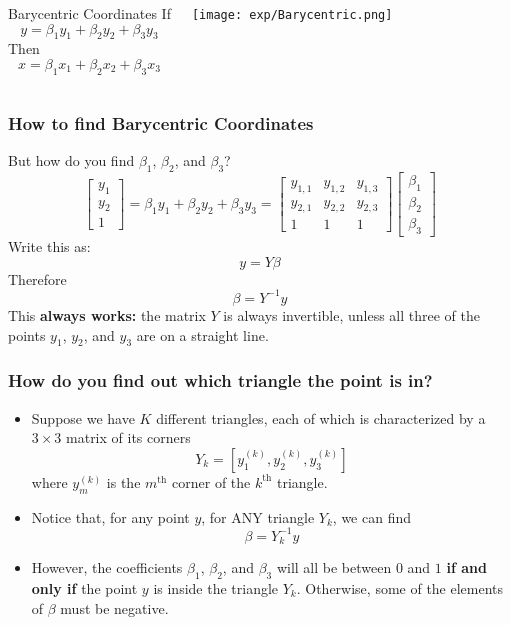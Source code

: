 \documentclass{beamer}
\begin{document}
\begin{frame}
  \begin{columns}[t]
    \column{2.5in}
    \begin{block}{Barycentric Coordinates}
      If
      \[
      y=\beta_1y_1+\beta_2y_2+\beta_3y_3
      \]
      Then
      \[
      x= \beta_1x_1+\beta_2x_2+\beta_3x_3
      \]
    \end{block}
    \column{2.25in}
    \begin{block}{}
      \centerline{\texttt{[image: exp/Barycentric.png]}}
    \end{block}
  \end{columns}
\end{frame}

\begin{frame}
  \frametitle{How to find Barycentric Coordinates}
  But how do you find $\beta_1$, $\beta_2$, and $\beta_3$?
  \[
  \left[\begin{array}{c}y_1\\y_2\\1\end{array}\right]=
  \beta_1y_1+\beta_2y_2+\beta_3y_3
  =\left[\begin{array}{ccc}y_{1,1}&y_{1,2}&y_{1,3}\\y_{2,1}&y_{2,2}&y_{2,3}\\1&1&1\end{array}\right]
  \left[\begin{array}{c}\beta_1\\\beta_2\\\beta_3\end{array}\right]
  \]
  Write this as:
  \[
  y=Y\beta
  \]
  Therefore
  \[
  \beta = Y^{-1}y
  \]
  This {\bf always works:} the matrix $Y$ is always invertible, unless
  all three of the points $y_1$, $y_2$, and $y_3$
  are on a straight line.
\end{frame}
\begin{frame}
  \frametitle{How do you find out which triangle
    the point is in?}
  \begin{itemize}
  \item Suppose we have $K$ different triangles, each of which is
    characterized by a $3\times 3$ matrix of its corners
    \[
    Y_k = \left[y_{1}^{(k)},y_{2}^{(k)},y_{3}^{(k)}\right]
    \]
    where $y_{m}^{(k)}$ is the $m^{\textrm{th}}$ corner of the
    $k^{\textrm{th}}$ triangle.
  \item Notice that, for any point $y$, for ANY triangle $Y_k$,
    we can find
    \[\beta = Y_k^{-1}y\]
  \item However, the coefficients $\beta_1$, $\beta_2$, and
    $\beta_3$ will all be between $0$ and $1$ {\bf if and only if}
    the point $y$ is inside the triangle $Y_k$.  Otherwise, some
    of the elements of $\beta$ must be negative.
  \end{itemize}
\end{frame}
\end{document}

